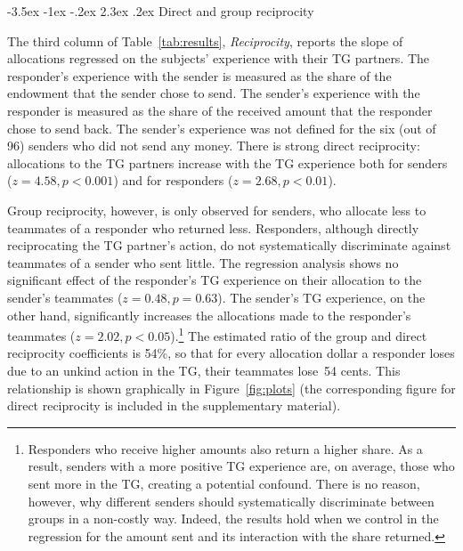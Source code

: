 \documentclass[12pt,a4paper]{article}\usepackage[]{graphicx}\usepackage[]{color}
\makeatletter
\renewcommand\subsection{\@startsection {subsection}{1}{\z@}%
{-3.5ex \@plus -1ex \@minus -.2ex}%
{2.3ex \@plus.2ex}%
{\it\large}}
\makeatother
\begin{document}
\subsection{Direct and group reciprocity}
\label{sec:reciprocity}

The third column of Table~\ref{tab:results}, \emph{Reciprocity}, reports the slope of
allocations regressed on the subjects' experience with their TG partners. 
The responder's experience with the sender is measured
as the share of the endowment that the sender chose to send. The sender's experience with the responder is measured as the share
of the received amount that the responder chose to send back. 
The sender's experience was not defined
for the six (out of 96) senders who did not send any money. 
%
There is strong direct reciprocity: allocations
to the TG partners increase with the TG experience both for
senders ($z=4.58,p< 0.001$) and for responders 
($z=2.68,p< 0.01$).

Group reciprocity, however, is only observed for senders, who allocate
less to teammates of a responder who returned less.
Responders,  although directly reciprocating the
TG partner's action, do not systematically discriminate against teammates
of a sender who sent little. The regression analysis shows no significant
effect of the responder's TG experience on their allocation to the sender's
teammates ($z=0.48,p= 0.63$). 
The sender's TG experience, on the other
hand, significantly increases the allocations made to the responder's teammates 
($z=2.02,p< 0.05$).\footnote{
  Responders who receive higher amounts also return a higher share. As a result, senders with a more positive TG experience are, on average, those who sent more in the TG, creating a potential confound. There is no reason, however, why different senders should systematically discriminate between groups in a non-costly way. Indeed, the results hold when we control in the regression for the amount sent and its interaction with the share returned.
}
The estimated ratio of the group and direct reciprocity coefficients
is 54\%, so that for every allocation dollar a responder
loses due to an unkind action in the TG, their teammates lose~54 cents. 
This relationship is shown graphically in Figure~\ref{fig:plots} (the corresponding figure for direct reciprocity is 
included in the supplementary material).




\end{document}
